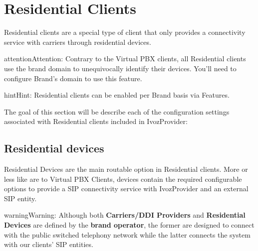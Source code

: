 \documentclass[letterpaper,10pt,english]{sphinxmanual}
\begin{document}
\section{Residential Clients}
\label{administration_portal/client/residential/index:residential-clients}\label{administration_portal/client/residential/index::doc}
Residential clients are a special type of client that only provides a connectivity
service with carriers through residential devices.

\begin{notice}{attention}{Attention:}
Contrary to the Virtual PBX clients, all Residential clients use the
brand domain to unequivocally identify their devices. You'll need to configure
Brand's domain to use this feature.
\end{notice}

\begin{notice}{hint}{Hint:}
Residential clients can be enabled per Brand basis via Features.
\end{notice}

The goal of this section will be describe each of the configuration settings
associated with Residential clients included in IvozProvider:


\subsection{Residential devices}
\label{administration_portal/client/residential/residential_devices:id1}\label{administration_portal/client/residential/residential_devices::doc}\label{administration_portal/client/residential/residential_devices:residential-devices}
Residential Devices are the main routable option in Residential clients.
More or less like {\hyperref[administration_portal/client/vpbx/routing_endpoints/friends/index:friends]{}} are to Virtual PBX Clients, devices
contain the required configurable options to provide a SIP connectivity
service with IvozProvider and an external SIP entity.

\begin{notice}{warning}{Warning:}
Although both \textbf{Carriers/DDI Providers} and \textbf{Residential Devices} are defined by the
\textbf{brand operator}, the former are designed to connect with the public switched telephony network
while the latter connects the system with our clients' SIP entities.
\end{notice}
\end{document}
